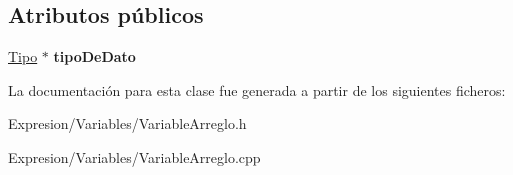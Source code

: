 \subsection*{Atributos públicos}
\begin{DoxyCompactItemize}
\item 
\hypertarget{class_variable_arreglo_aab12833270823472f4f703acaf113fd8}{\hyperlink{class_tipo}{Tipo} $\ast$ {\bfseries tipo\-De\-Dato}}\label{class_variable_arreglo_aab12833270823472f4f703acaf113fd8}

\end{DoxyCompactItemize}


La documentación para esta clase fue generada a partir de los siguientes ficheros\-:\begin{DoxyCompactItemize}
\item 
Expresion/\-Variables/Variable\-Arreglo.\-h\item 
Expresion/\-Variables/Variable\-Arreglo.\-cpp\end{DoxyCompactItemize}
